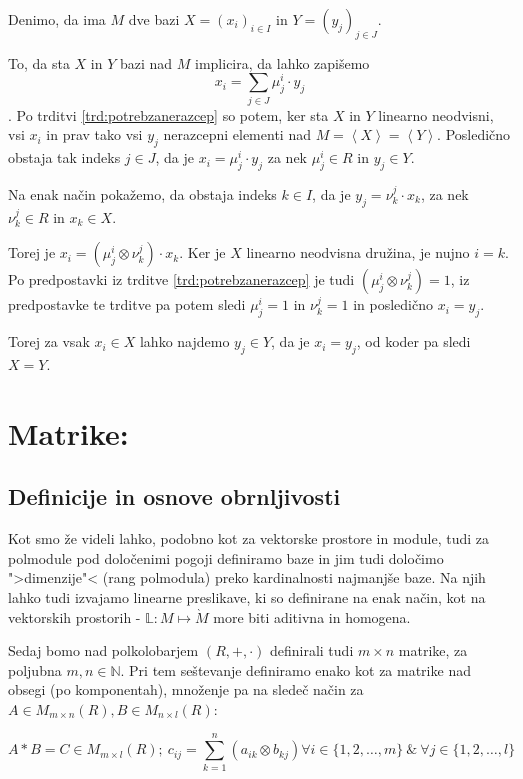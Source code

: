 \documentclass[mat1]{fmfdelo}
\newcommand{\N}{\mathbb{N}}
\newcommand{\Gen}[1]{\ensuremath{\left<{#1}\right>}}
\begin{document}
\begin{dokaz}
	Denimo, da ima $M$ dve bazi $X=(x_i)_{i\in I}$ in $Y=(y_j)_{j \in J}$. 
	
	To, da sta $X$ in $Y$ bazi nad $M$ implicira, da lahko zapišemo $$x_i = \sum_{j\in J}\mu_j^i\cdot y_j $$.
	Po trditvi \ref{trd:potrebzanerazcep} so potem, ker sta $X$ in $Y$ linearno neodvisni, vsi $x_i$ in prav tako vsi $y_j$ nerazcepni elementi nad $M = \Gen{X} = \Gen{Y}$. Posledično obstaja tak indeks $j\in J$, da je $x_i = \mu_j^i \cdot y_j$ za nek $\mu_j^i \in R$ in $y_j\in Y$.
	
	Na enak način pokažemo, da obstaja indeks $k\in I$, da je $y_j = \nu_k^j \cdot x_k$, za nek $\nu_k^j \in R$ in $x_k \in X$.

	Torej je $x_i = (\mu_j^i \otimes \nu_k^j) \cdot x_k$. Ker je $X$ linearno neodvisna družina, je nujno $i = k$. Po predpostavki iz trditve \ref{trd:potrebzanerazcep} je tudi $(\mu_j^i \otimes \nu_k^j) = 1$, iz predpostavke te trditve pa potem sledi $\mu_j^i = 1$ in $\nu_k^j = 1$ in posledično $x_i = y_j$.
	
	Torej za vsak $x_i\in X$ lahko najdemo $y_j\in Y$, da je $x_i = y_j$, od koder pa sledi $X = Y$.
\end{dokaz}

\section{Matrike:}

\subsection{Definicije in osnove obrnljivosti}

Kot smo že videli lahko, podobno kot za vektorske prostore in module, tudi za polmodule pod določenimi pogoji definiramo baze in jim tudi določimo ">dimenzije"< (rang polmodula) preko kardinalnosti najmanjše baze. Na njih lahko tudi izvajamo linearne preslikave, ki so definirane na enak način, kot na vektorskih prostorih - $\mathbb{L}: M \mapsto \grave{M}$ more biti aditivna in homogena.

Sedaj bomo nad polkolobarjem $(R, +, \cdot)$ definirali tudi $m\times n$ matrike, za poljubna $m,n\in\N$. Pri tem seštevanje definiramo enako kot za matrike nad obsegi (po komponentah), množenje pa na sledeč način za $A\in M_{m\times n}(R), B\in M_{n\times l}(R)$:

$$ 
	A*B = C \in M_{m\times l}(R);~ c_{ij} = \sum_{k = 1}^{n}(a_{ik}\otimes b_{kj}) \forall i \in \{1, 2, \ldots, m\}~\&~\forall j \in \{1, 2, \ldots, l\}
$$
\end{document}
